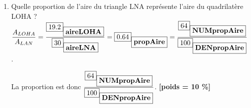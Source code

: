 \documentclass[10pt,a4paper]{article}
\newcommand{\poids}[1]{ {\bf [poids = #1 \%]}}
\newcommand{\var}[2]{\fbox{#2}_{\fbox{\mbox{\bf #1}}}}
\begin{document}
\begin{enumerate}
\begin{enumerate}
\(\displaystyle A_{LNA}=\dfrac{\var{LN}{5}\times \var{AL}{12}}{2}=\var{aireLNA}{30}~(\text{cm}^{2})\).

\(\displaystyle A_{OHN}=\dfrac{\var{ON}{3}\times  \var{OH}{7.25}}{2}=\var{aireOHN}{10.8}~~(\text{cm}^{2})\).

\(\displaystyle A_{LOHA}=A_{LNA} - A_{OHN}=\var{aireLOHA}{19.2}~~(\text{cm}^{2})\).
\poids{20} %
\item 
Quelle proportion de l'aire du triangle LNA représente l'aire du quadrilatère LOHA ?
\(\displaystyle \dfrac{A_{LOHA}}{A_{LAN}}=\dfrac{\var{aireLOHA}{19.2}}{\var{aireLNA}{30}}=\var{propAire}{0.64}=\dfrac{\var{NUMpropAire}{64}}{\var{DENpropAire}{100}}\).

La proportion est donc \(\displaystyle \dfrac{\var{NUMpropAire}{64}}{\var{DENpropAire}{100}}\).
\poids{10} %
\end{enumerate}
\end{enumerate}
\end{document}
